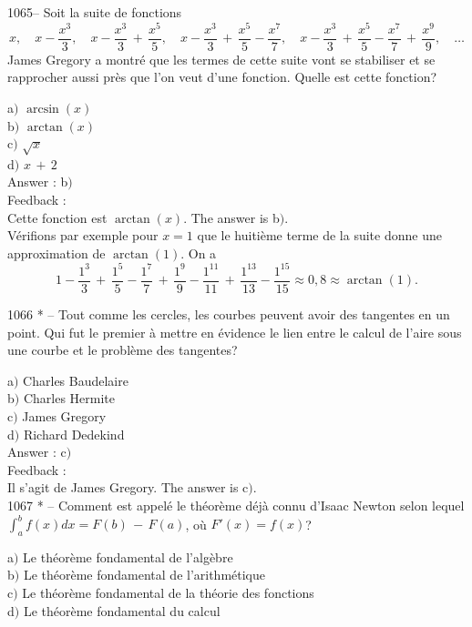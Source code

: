 ﻿\documentclass[letterpaper, 12pt]{article}
\begin{document}
1065-- Soit la suite de fonctions
$$\displaystyle{x,\quad x-\frac{x^3}3,\quad
x-\frac{x^3}3\,+\,\frac{x^5}5,\quad
x-\frac{x^3}3\,+\,\frac{x^5}5-\frac{x^7}7,\quad
x-\frac{x^3}3\,+\,\frac{x^5}5-\frac{x^7}7\,+\,\frac{x^9}9,\quad\ldots}$$
James Gregory a montr\'e que les termes de cette suite vont se
stabiliser et se rapprocher aussi pr\`es que l'on veut d'une
fonction. Quelle est cette fonction?

a$)$ $\arcsin(x)$ \\
b$)$ $\arctan(x)$  \\
c$)$ $\sqrt x$  \\
d$)$ $x\,+\,2$\\

Answer : b$)$\\

Feedback : \\
Cette fonction est $\arctan(x)$. The answer is b$)$.\\
V\'erifions par exemple pour $x=1$ que le huiti\`eme terme de la
suite donne une approximation de $\arctan(1)$. On a
$$1-\frac{1^3}3\,+\,\frac{1^5}5-\frac{1^7}7\,+\,\frac{1^9}9-\frac{1^{11}}{11}\,+\,\frac{1^{13}}{13}-\frac{1^{15}}{15}\approx0,8\approx\arctan(1).$$


1066 * -- Tout comme les cercles, les courbes peuvent avoir des
tangentes en un point. Qui fut le premier \`a mettre en \'evidence
le lien entre le calcul de l'aire sous une courbe et le probl\`eme
des tangentes?

a$)$ Charles Baudelaire \\
b$)$ Charles Hermite \\
c$)$ James Gregory  \\
d$)$ Richard Dedekind \\

Answer : c$)$ \\

Feedback : \\
Il s'agit de James Gregory.
The answer is c$)$.\\

1067 * -- Comment est appel\'e le th\'eor\`eme d\'ej\`a connu
d'Isaac Newton selon lequel $\int_a^bf(x)dx=F(b)\,-\,F(a)$, o\`u
$F'(x)=f(x)$?

a$)$ Le th\'eor\`eme fondamental de l'alg\`ebre \\
b$)$ Le th\'eor\`eme fondamental de l'arithm\'etique  \\
c$)$ Le th\'eor\`eme fondamental de la th\'eorie des fonctions  \\
d$)$ Le th\'eor\`eme fondamental du calcul\\
\end{document}
